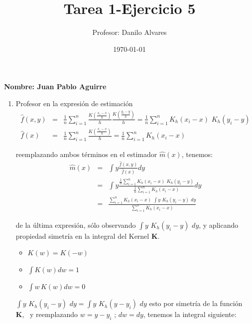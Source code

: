 \documentclass[12pt,letterpaper]{article}
\begin{document}
\title{ {\bf Tarea 1-Ejercicio 5}}
\author{Profesor: Danilo Alvares}
\date{\today}
\maketitle
{\bf Nombre: Juan Pablo Aguirre}\\


\begin{enumerate}
\item  Profesor en la  expresi\'on de estimaci\'on 
\begin{eqnarray*}
\hat{f}\left(x,y\right)&=& \frac{1}{n} \sum_{i=1}^{n} \frac{K\left( \frac{x_{i}-x}{h} \right)}{h}  \frac{K\left(\frac{y_{i}-y}{h}\right)}{h} =\frac{1}{n}\sum_{i=1}^{n} K_{h}\left(x_{i}-x\right) \,\, K_{h}\left(y_{i}-y\right)\\
\hat{f}\left(x\right) &=&  \frac{1}{n} \sum_{i=1}^{n} \frac{K\left(\frac{x_{i}-x}{h}\right)}{h}=  \frac{1}{n}\sum_{i=1}^{n} K_{h}\left(x_{i}-x\right) 
\end{eqnarray*}

 reemplazando ambos t\'erminos  en el estimador $\hat{m}\left(x\right)$,  tenemos:
\begin{eqnarray*}
\hat{m}\left(x\right)&=& \int y \frac{\hat{f}\left( x,y\right)}{\hat{f}\left( x\right)} dy\\
&=&  \int y \frac{\frac{1}{n}\sum_{i=1}^{n} K_{h}\left(x_{i}-x\right) \,\, K_{h}\left(y_{i}-y\right)}{\frac{1}{n}\sum_{i=1}^{n} K_{h}\left(x_{i}-x\right) } dy\\
&=&  \frac{\sum_{i=1}^{n} K_{h}\left(x_{i}-x\right) \,\, \int y \,\, K_{h}\left(y_{i}-y\right)\,\, dy}{\sum_{i=1}^{n} K_{h}\left(x_{i}-x\right) } 
\end{eqnarray*}


de la \'ultima expresi\'on,  s\'olo observando $ \int y \,\, K_{h}\left(y_{i}-y\right) \,\, dy$, y aplicando propiedad simetr\'{i}a en la integral del {Kernel} {\bf K}.
\begin{itemize}
\item $K\left(w \right)=K\left(-w \right)$
\item $\int K\left( w\right) dw=1$ 
\item $\int w\, K\left( w\right) dw=0$
\end{itemize}
 $ \int y \,\, K_{h}\left(y_{i}-y\right) \,\, dy=\int y \,\, K_{h}\left(y-y_{i}\right) \,\, dy$ esto por simetr\'{i}a de la funci\'on {\bf K},\,\,\, y reemplazando  $w=y-y_{i}$ ; $dw=dy$, tenemos la integral siguiente:


\end{enumerate}
\end{document}
